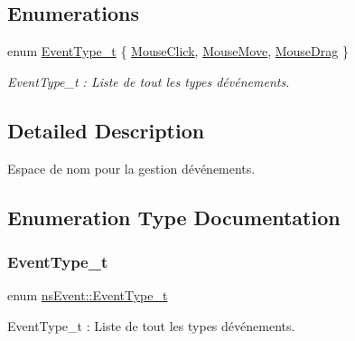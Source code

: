 \subsection*{Enumerations}
\begin{DoxyCompactItemize}
\item 
enum \hyperlink{namespacens_event_a6e501b1114a041d127a56f51c66ada72}{Event\+Type\+\_\+t} \{ \hyperlink{namespacens_event_a6e501b1114a041d127a56f51c66ada72ac40555e94dcfb35e033e2314259db5f7}{Mouse\+Click}, 
\hyperlink{namespacens_event_a6e501b1114a041d127a56f51c66ada72addbed44248cc7bf27e68c8e83a4af4c6}{Mouse\+Move}, 
\hyperlink{namespacens_event_a6e501b1114a041d127a56f51c66ada72a31c8442274463772ed6cc9c47bce8317}{Mouse\+Drag}
 \}\begin{DoxyCompactList}\small\item\em Event\+Type\+\_\+t \+: Liste de tout les types d\textquotesingle{}événements. \end{DoxyCompactList}
\end{DoxyCompactItemize}


\subsection{Detailed Description}
Espace de nom pour la gestion d\textquotesingle{}événements. 

\subsection{Enumeration Type Documentation}
\mbox{\label{namespacens_event_a6e501b1114a041d127a56f51c66ada72}} 
\subsubsection{\texorpdfstring{Event\+Type\+\_\+t}{EventType\_t}}
{\footnotesize\ttfamily enum \hyperlink{namespacens_event_a6e501b1114a041d127a56f51c66ada72}{ns\+Event\+::\+Event\+Type\+\_\+t}}



Event\+Type\+\_\+t \+: Liste de tout les types d\textquotesingle{}événements. 

